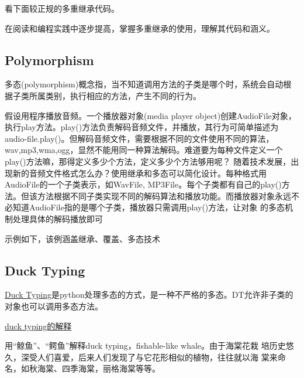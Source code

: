 看下面较正规的多重继承代码。

在阅读和编程实践中逐步提高，掌握多重继承的使用，理解其代码和涵义。
\subsection{Polymorphism}
多态(polymorphism)概念指，当不知道调用方法的子类是哪个时，系统会自动根
据子类所属类别，执行相应的方法，产生不同的行为。

假设用程序播放音频。一个播放器对象(media player object)创建AudioFile对象，执行play方法。play()方法负责解码音频文件，并播放，其行为可简单描述为audio-file.play()。但解码音频文件，需要根据不同的文件使用不同的算法，wav,mp3,wma,ogg，显然不能用同一种算法解码。难道要为每种文件定义一个play()方法嘛，那得定义多少个方法，定义多少个方法够用呢？ 随着技术发展，出现新的音频文件格式怎么办？使用继承和多态可以简化设计。每种格式用AudioFile的一个子类表示，如WavFile, MP3File。每个子类都有自己的play()方法。但该方法根据不同子类实现不同的解码算法和播放功能。而播放器对象永远不必知道AudioFile指的是哪个子类，播放器只需调用play()方法，让对象
的多态机制处理具体的解码播放即可

示例如下，该例涵盖继承、覆盖、多态技术

\subsection{Duck Typing}

\href{http://en.wikipedia.org/wiki/Duck_typing}{Duck Typing}是python处理多态的方式，是一种不严格的多态。DT允许非子类的对象也可以调用多态方法。

\href{http://www.voidspace.org.uk/python/articles/duck_typing.shtlm}{duck typing的解释}





用“鲸鱼”、“鳄鱼”解释duck typing，fishable-like whale。由于海棠花栽
培历史悠久，深受人们喜爱，后来人们发现了与它花形相似的植物，往往就以海
棠来命名，如秋海棠、四季海棠，丽格海棠等等。

